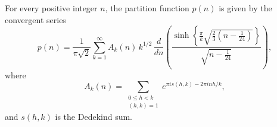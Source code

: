 For every positive integer $n$, the partition function $p(n)$ is given by the convergent series
$$
p(n) = \frac{1}{\pi \sqrt{2}} \sum_{k=1}^{\infty} A_k(n) \, k^{1/2} \, \frac{d}{dn} \left( \frac{\sinh \left\{ \frac{\pi}{k} \sqrt{\frac{2}{3} \left(n - \frac{1}{24}\right)} \right\}}{\sqrt{n - \frac{1}{24}}} \right),
$$
where
$$
A_k(n) = \sum_{\substack{0 \leq h < k \\ (h, k) = 1}} e^{\pi i s(h, k) - 2\pi i nh/k},
$$
and $s(h, k)$ is the Dedekind sum.
